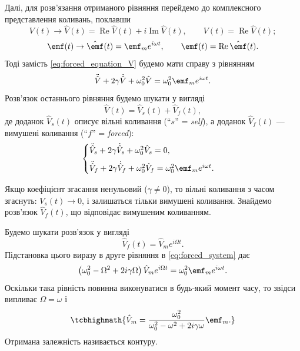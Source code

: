 Далі, для розв'язання отриманого рівняння перейдемо до комплексного
представлення коливань, поклавши
\begin{equation}\label{eq:complex_representation}
	V(t) \to \hat{V}(t) = \operatorname{Re}\hat{V}(t) + i\operatorname{Im}\hat{V}(t), \qquad
	V(t) = \operatorname{Re}\hat{V}(t);
\end{equation}
\begin{equation}\label{eq:complex_EMF}
	\emf(t) \to \hat{\emf}(t) = \emf_m e^{i\omega t}, \qquad
	\emf(t) = \operatorname{Re}\hat{\emf}(t).
\end{equation}
Тоді замість \eqref{eq:forced_equation_V} будемо мати справу з рівнянням
\begin{equation}\label{eq:complex_forced}
	\ddot{\hat{V}} + 2\gamma\dot{\hat{V}} + \omega_0^2 \hat{V} = \omega_0^2\emf_m e^{i\omega t}.
\end{equation}
Розв'язок останнього рівняння будемо шукати у вигляді
\begin{equation}\label{eq:solution_decomposition}
	\hat{V}(t) = \hat{V}_s(t) + \hat{V}_f(t),
\end{equation}
де доданок $\hat{V}_s(t)$ описує вільні коливання (\enquote{$s$} = \emph{self}), а доданок $\hat{V}_f(t)$ --- вимушені коливання (\enquote{$f$} = \emph{forced}):
\begin{equation}\label{eq:forced_system}
	\begin{cases}
		\ddot{\hat{V}}_s + 2\gamma\dot{\hat{V}}_s + \omega_0^2 \hat{V}_s = 0, \\[6pt]
		\ddot{\hat{V}}_f + 2\gamma\dot{\hat{V}}_f + \omega_0^2 \hat{V}_f = \omega_0^2\emf_m e^{i\omega t}.
	\end{cases}
\end{equation}

Якщо коефіцієнт згасання ненульовий ($\gamma \neq 0$), то вільні коливання з часом згаснуть: $V_s(t) \to 0$, і залишаться тільки вимушені
коливання. Знайдемо розв'язок $\hat{V}_f(t)$, що відповідає вимушеним коливанням.

Будемо шукати розв'язок у вигляді
\begin{equation}\label{eq:ansatz_forced}
	\hat{V}_f(t) = \hat{V}_m e^{i\Omega t}.
\end{equation}
Підстановка цього виразу в друге рівняння в \eqref{eq:forced_system} дає
\begin{equation}\label{eq:substitution_forced}
	\left(\omega_0^2 - \Omega^2 + 2i\gamma\Omega\right)\hat{V}_m e^{i\Omega t} = \omega_0^2\emf_m e^{i\omega t}.
\end{equation}
Оскільки така рівність повинна виконуватися в будь-який момент часу, то звідси випливає $\Omega = \omega$ і
\begin{equation}\label{eq:V0_frequency_response}
	\tcbhighmath{
		\hat{V}_m = \frac{\omega_0^2}{\omega_0^2 - \omega^2 + 2i\gamma\omega}\emf_m.
	}
\end{equation}
Отримана залежність називається  контуру.

